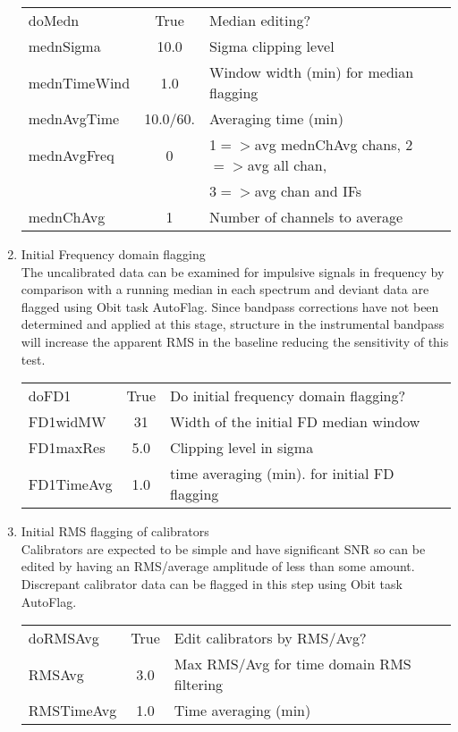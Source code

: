 \documentclass[11pt]{article}
\begin{document}
\begin{enumerate}
\begin{center}
\begin{tabular}{|l|c|l|}
\hline
doMedn       & True & Median editing? \\
mednSigma    & 10.0 &  Sigma clipping level\\
mednTimeWind & 1.0  &  Window width (min) for median flagging\\
mednAvgTime  & 10.0/60. & Averaging time (min) \\
mednAvgFreq  & 0    &  1$=>$avg mednChAvg chans, 2$=>$avg all chan,\\
 & & 3$=>$avg chan and IFs\\
mednChAvg    & 1    &  Number of channels to average\\
\hline
\end{tabular}
\end{center}
%
\item Initial Frequency domain flagging\\
The uncalibrated data can be examined for impulsive signals in
frequency by comparison with a running median in each spectrum and
deviant data are flagged using Obit task AutoFlag.
Since bandpass corrections have not been determined and applied at
this stage, structure in the instrumental bandpass will increase the
apparent RMS in the baseline reducing the sensitivity of this test.
\begin{center}
\begin{tabular}{|l|c|l|}
\hline
doFD1       & True &  Do initial frequency domain flagging?\\
FD1widMW    & 31   &  Width of the initial FD median window\\
FD1maxRes   & 5.0  &  Clipping level in sigma \\
FD1TimeAvg  & 1.0  &  time averaging (min). for initial FD flagging\\
\hline
\end{tabular}
\end{center}
%
\item Initial RMS flagging of calibrators \\
Calibrators are expected to be simple and have  significant SNR so can
be edited by having an RMS/average amplitude of less than some
amount.
Discrepant calibrator data can be flagged in this step using Obit task
AutoFlag.
\begin{center}
\begin{tabular}{|l|c|l|}
\hline
doRMSAvg   & True &  Edit calibrators by RMS/Avg?\\
RMSAvg     & 3.0  &  Max RMS/Avg for time domain RMS filtering\\
RMSTimeAvg & 1.0  &  Time averaging (min)\\

\end{tabular}
\end{center}
\end{enumerate}
\end{document}

